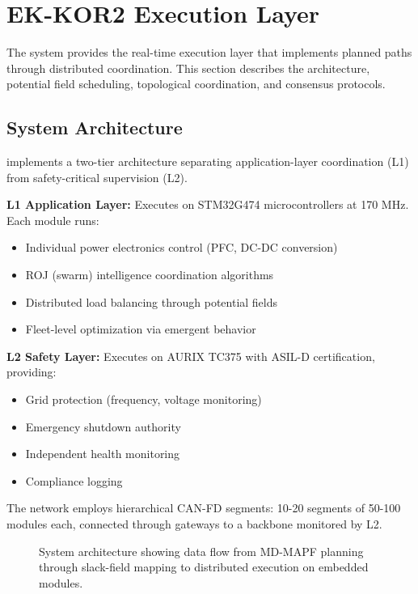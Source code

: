 \section{EK-KOR2 Execution Layer}
\label{sec:ekkor2}

The \ekkor{} system provides the real-time execution layer that implements planned paths through distributed coordination. This section describes the architecture, potential field scheduling, topological coordination, and consensus protocols.

\subsection{System Architecture}

\ekkor{} implements a two-tier architecture separating application-layer coordination (L1) from safety-critical supervision (L2).

\textbf{L1 Application Layer:} Executes on STM32G474 microcontrollers at 170 MHz. Each module runs:
\begin{itemize}
    \item Individual power electronics control (PFC, DC-DC conversion)
    \item ROJ (swarm) intelligence coordination algorithms
    \item Distributed load balancing through potential fields
    \item Fleet-level optimization via emergent behavior
\end{itemize}

\textbf{L2 Safety Layer:} Executes on AURIX TC375 with ASIL-D certification, providing:
\begin{itemize}
    \item Grid protection (frequency, voltage monitoring)
    \item Emergency shutdown authority
    \item Independent health monitoring
    \item Compliance logging
\end{itemize}

The network employs hierarchical CAN-FD segments: 10-20 segments of 50-100 modules each, connected through gateways to a backbone monitored by L2.

\begin{figure}[htbp]
\centering

\caption{System architecture showing data flow from MD-MAPF planning through slack-field mapping to distributed execution on embedded modules.}
\label{fig:architecture}
\end{figure}

